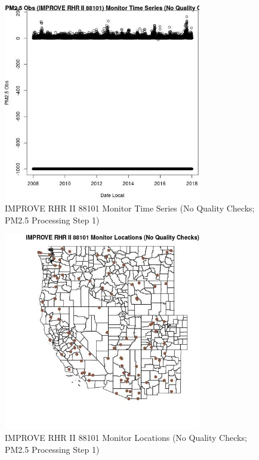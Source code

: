 
\begin{figure} 
\centering  
\includegraphics[width=0.77\textwidth]{Code_Outputs/PM25Source5TSstep1_PM25_ObsvDate_Local.jpg} 
\caption{\label{fig:PM25Source5TSstep1PM25_ObsvDate_Local}IMPROVE RHR II 88101 Monitor Time Series (No Quality Checks; PM2.5 Processing Step 1)} 
\end{figure} 
 

\begin{figure} 
\centering  
\includegraphics[width=0.77\textwidth]{Code_Outputs/PM25Source5TSstep1_MapIMPRHRII88101Locations.jpg} 
\caption{\label{fig:PM25Source5TSstep1MapIMPRHRII88101Locations}IMPROVE RHR II 88101 Monitor Locations (No Quality Checks; PM2.5 Processing Step 1)} 
\end{figure} 
 
